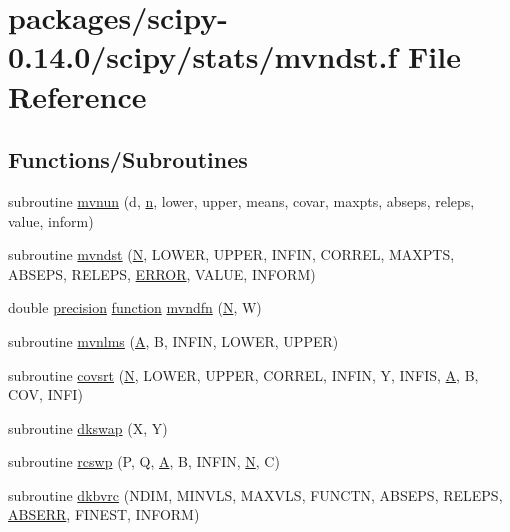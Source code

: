 \hypertarget{mvndst_8f}{}\section{packages/scipy-\/0.14.0/scipy/stats/mvndst.f File Reference}
\label{mvndst_8f}
\subsection*{Functions/\+Subroutines}
\begin{DoxyCompactItemize}
\item 
subroutine \hyperlink{mvndst_8f_ac1b69c420eda63f3b4bbc9d2645f2dc1}{mvnun} (d, \hyperlink{indexexpr_8h_ab427e2e2b4d6cec55fa088ea2a692ace}{n}, lower, upper, means, covar, maxpts, abseps, releps, value, inform)
\item 
subroutine \hyperlink{mvndst_8f_aa7433496285f176970d2d8285f7a51d2}{mvndst} (\hyperlink{polmisc_8c_a0240ac851181b84ac374872dc5434ee4}{N}, L\+O\+W\+E\+R, U\+P\+P\+E\+R, I\+N\+F\+I\+N, C\+O\+R\+R\+E\+L, M\+A\+X\+P\+T\+S, A\+B\+S\+E\+P\+S, R\+E\+L\+E\+P\+S, \hyperlink{zeros_8h_a7e7d9c7d645a60f5fe44dc246198e5a7}{E\+R\+R\+O\+R}, V\+A\+L\+U\+E, I\+N\+F\+O\+R\+M)
\item 
double \hyperlink{numinquire_8h_a2c8e616467665d0b2814d4c1589ba74e}{precision} \hyperlink{afunc_8m_a7b5e596df91eadea6c537c0825e894a7}{function} \hyperlink{mvndst_8f_a7ebf7fc2e9e2b6716c0b74e85faeee2b}{mvndfn} (\hyperlink{polmisc_8c_a0240ac851181b84ac374872dc5434ee4}{N}, W)
\item 
subroutine \hyperlink{mvndst_8f_a34b68e16cc11e0751e9bae299aa3829b}{mvnlms} (\hyperlink{classA}{A}, B, I\+N\+F\+I\+N, L\+O\+W\+E\+R, U\+P\+P\+E\+R)
\item 
subroutine \hyperlink{mvndst_8f_acf06d2a940d718c0817497207f708318}{covsrt} (\hyperlink{polmisc_8c_a0240ac851181b84ac374872dc5434ee4}{N}, L\+O\+W\+E\+R, U\+P\+P\+E\+R, C\+O\+R\+R\+E\+L, I\+N\+F\+I\+N, Y, I\+N\+F\+I\+S, \hyperlink{classA}{A}, B, C\+O\+V, I\+N\+F\+I)
\item 
subroutine \hyperlink{mvndst_8f_ae3c092f6cb58cb339c4de96ea94dd84b}{dkswap} (X, Y)
\item 
subroutine \hyperlink{mvndst_8f_ad9368ac20446b76075776149e3d414f5}{rcswp} (P, Q, \hyperlink{classA}{A}, B, I\+N\+F\+I\+N, \hyperlink{polmisc_8c_a0240ac851181b84ac374872dc5434ee4}{N}, C)
\item 
subroutine \hyperlink{mvndst_8f_af18eea937f9dcb875c0c6f0e1561756c}{dkbvrc} (N\+D\+I\+M, M\+I\+N\+V\+L\+S, M\+A\+X\+V\+L\+S, F\+U\+N\+C\+T\+N, A\+B\+S\+E\+P\+S, R\+E\+L\+E\+P\+S, \hyperlink{sincos_8c_a41d7e4696478e23fa2d6be14cf2bfcfd}{A\+B\+S\+E\+R\+R}, F\+I\+N\+E\+S\+T, I\+N\+F\+O\+R\+M)

\end{DoxyCompactItemize}
